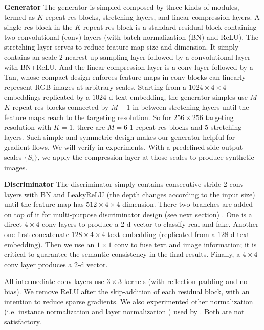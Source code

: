 \documentclass[10pt,twocolumn,letterpaper]{article}
\begin{document}
\textbf{Generator} The generator is simpled composed by three kinds of modules, termed as $K$-repeat res-blocks, stretching layers, and linear compression layers.
A single res-block in the $K$-repeat res-block is a standard residual block  \cite{he2016identity} containing two convolutional (conv) layers (with batch normalization (BN) \cite{ioffe2015batch} and ReLU). The stretching layer serves to reduce feature map size and dimension. It simply contains an scale-$2$ nearest up-sampling layer followed by a convolutional layer with BN+ReLU. And the linear compression layer is a conv layer followed by a Tan, whose compact design enforces feature maps in conv blocks can linearly represent RGB images at arbitrary scales.
Starting from a $1024{\times}4{\times}4$ embeddings replicated by a $1024$-d text embedding, the generator simples use $M$ $K$-repeat res-blocks connected by $M{-}1$ in-between stretching layers until the feature maps reach to the targeting resolution. So for $256{\times}256$ targeting resolution with $K{=}1$, there are $M{=}6$ $1$-repeat res-blocks and $5$ stretching layers. Such simple and symmetric design makes our generator helpful for gradient flows. We will verify in experiments. 
With a predefined side-output scales $\{S_i\}$, we apply the compression layer at those scales to produce synthetic images.

\textbf{Discriminator} The discriminator simply contains consecutive stride-2 conv layers with BN and LeakyReLU \cite{} (the depth changes according to the input size) until the feature map has $512{\times}4{\times}4$ dimension. There two branches are added on top of it for multi-purpose discriminator design (see next section) . One is a direct $4{\times}4$ conv layers to produce a 2-d vector to classify real and fake. Another one first concatenate $128{\times}4{\times}4$ text embedding (replicated from a $128$-d text embedding). Then we use an $1{\times}1$ conv to fuse text and image information; it is critical to guarantee the semantic consistency in the final results. Finally, a $4{\times}4$ conv layer produces a 2-d vector.

All intermediate conv layers use $3{\times}3$ kernels (with reflection padding and no bias). We remove ReLU after the skip-addition of each residual block, with an intention to reduce sparse gradients. 
We also experimented other normalization (i.e. instance normalization \cite{ulyanov2016instance} and layer normalization \cite{ba2016layer}) used by \cite{zhu2017unpaired,chen2017photographic}. Both are not satisfactory. 
\end{document}
